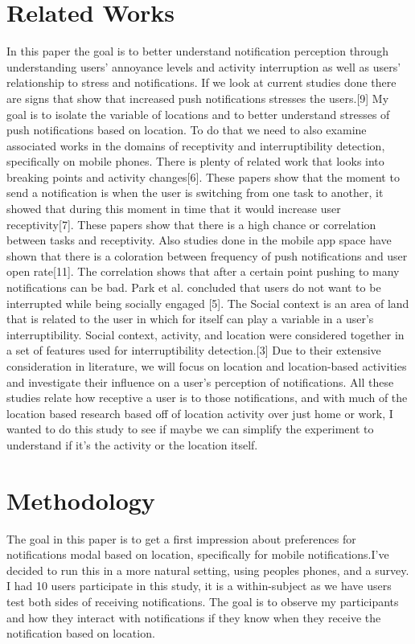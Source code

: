 \documentclass{vgtc}                          %
\begin{document}
\section{Related Works}
In this paper the goal is to better understand notification perception through understanding users' annoyance levels and activity interruption as well as users' relationship to stress and notifications. If we look at current studies done there are signs that show that increased push notifications stresses the users.[9] My goal is to isolate the variable of locations and to better understand stresses of push notifications based on location. To do that we need to also examine associated works in the domains of receptivity and interruptibility detection, specifically on mobile phones. There is plenty of related work that looks into breaking points and activity changes[6]. These papers show that the moment to send a notification is when the user is switching from one task to another, it showed that during this moment in time that it would increase user receptivity[7]. These papers show that there is a high chance or correlation between tasks and receptivity.
	Also studies done in the mobile app space have shown that there is a coloration between frequency of push notifications and user open rate[11]. The correlation shows that after a certain point pushing to many notifications can be bad. 
Park et al. concluded that users do not want to be interrupted while being socially engaged [5]. The Social context is an area of land that is related to the user in which for itself can play a variable in a user's interruptibility. Social context, activity, and location were considered together in a set of features used for interruptibility detection.[3] Due to their extensive consideration in literature, we will focus on location and location-based activities and investigate their influence on a user’s perception of notifications. 
All these studies relate how receptive a user is to those notifications, and with much of the location based research based off of location activity over just home or work, I wanted to do this study to see if maybe we can simplify the experiment to understand if it's the activity or the location itself. 

\section{Methodology}
The goal in this paper is to get a first impression about preferences for notifications modal based on location, specifically for mobile notifications.I’ve decided to run this in a more natural setting, using peoples phones, and a survey. I had 10 users participate in this study, it is a within-subject as we have users test both sides of receiving notifications. The goal is to observe my participants and how they interact with notifications if they know when they receive the notification based on location.
\end{document}
